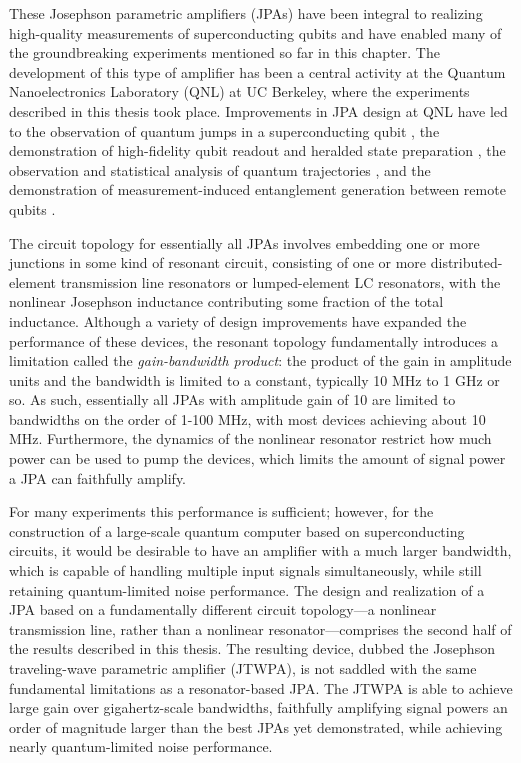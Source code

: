 These Josephson parametric amplifiers (JPAs) have been integral to realizing high-quality measurements of superconducting qubits and have enabled many of the groundbreaking experiments mentioned so far in this chapter.  The development of this type of amplifier has been a central activity at the Quantum Nanoelectronics Laboratory (QNL) at UC Berkeley, where the experiments described in this thesis took place.  Improvements in JPA design at QNL have led to the observation of quantum jumps in a superconducting qubit \cite{Vijay:2011kx,slichterthesis}, the demonstration of high-fidelity qubit readout and heralded state preparation \cite{fluxqb}, the observation and statistical analysis of quantum trajectories \cite{murch_observing_2013,Weber2014,Weber2014a}, and the demonstration of measurement-induced entanglement generation between remote qubits \cite{Roch2014}.

The circuit topology for essentially all JPAs involves embedding one or more junctions in some kind of resonant circuit, consisting of one or more distributed-element transmission line resonators or lumped-element LC resonators, with the nonlinear Josephson inductance contributing some fraction of the total inductance.  Although a variety of design improvements have expanded the performance of these devices, the resonant topology fundamentally introduces a limitation called the \textit{gain-bandwidth product}: the product of the gain in amplitude units and the bandwidth is limited to a constant, typically 10 MHz to 1 GHz or so.  As such, essentially all JPAs with amplitude gain of 10 are limited to bandwidths on the order of 1-100 MHz, with most devices achieving about 10 MHz.  Furthermore, the dynamics of the nonlinear resonator restrict how much power can be used to pump the devices, which limits the amount of signal power a JPA can faithfully amplify.

For many experiments this performance is sufficient; however, for the construction of a large-scale quantum computer based on superconducting circuits, it would be desirable to have an amplifier with a much larger bandwidth, which is capable of handling multiple input signals simultaneously, while still retaining quantum-limited noise performance.  The design and realization of a JPA based on a fundamentally different circuit topology---a nonlinear transmission line, rather than a nonlinear resonator---comprises the second half of the results described in this thesis.  The resulting device, dubbed the Josephson traveling-wave parametric amplifier (JTWPA), is not saddled with the same fundamental limitations as a resonator-based JPA.  The JTWPA is able to achieve large gain over gigahertz-scale bandwidths, faithfully amplifying signal powers an order of magnitude larger than the best JPAs yet demonstrated, while achieving nearly quantum-limited noise performance.


